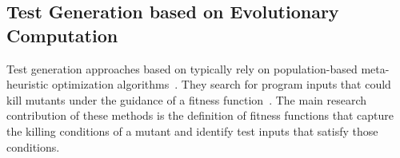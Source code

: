 %
%
%
%



\subsection{Test Generation based on Evolutionary Computation}

Test generation approaches based on  typically rely on population-based meta-heuristic optimization algorithms~\cite{harman2011strong}. 
They search for program inputs that could kill mutants under the guidance of a fitness function~\cite{harman2011strong}. 
The main research contribution of these methods is the definition of fitness functions that capture the killing conditions of a mutant and identify test inputs that satisfy those conditions.

